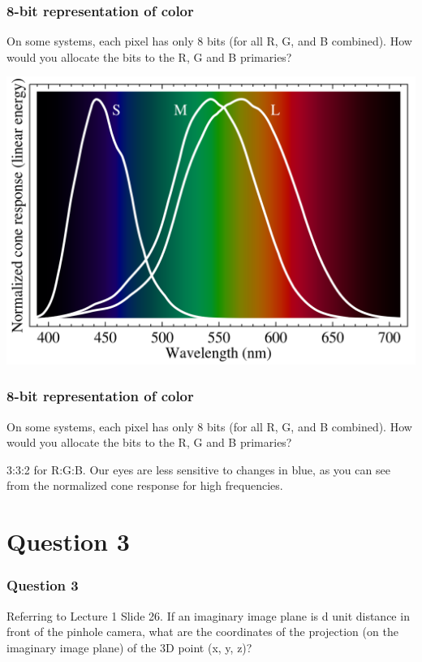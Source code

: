 \documentclass{beamer}
\begin{document}
\begin{frame}
    \frametitle{8-bit representation of color}
    On some systems, each pixel has only 8 bits (for all R, G, and B combined). 
    How would you allocate the bits to the R, G and B primaries?

    \begin{center}
        \includegraphics[scale=0.2]{cone-vision.png}
    \end{center}

\end{frame}

\begin{frame}
    \frametitle{8-bit representation of color}
    On some systems, each pixel has only 8 bits (for all R, G, and B combined). 
    How would you allocate the bits to the R, G and B primaries?

    \begin{tcolorbox}
        3:3:2 for R:G:B. Our eyes are less sensitive to changes in blue, 
        as you can see from the normalized cone response for high frequencies.
    \end{tcolorbox}

\end{frame}

\section{Question 3}

\begin{frame}
    \frametitle{Question 3}
    Referring to Lecture 1 Slide 26. If an imaginary image plane is d unit distance in front of the
    pinhole camera, what are the coordinates of the projection (on the imaginary image plane) of
    the 3D point (x, y, z)?
\end{frame}
\end{document}
